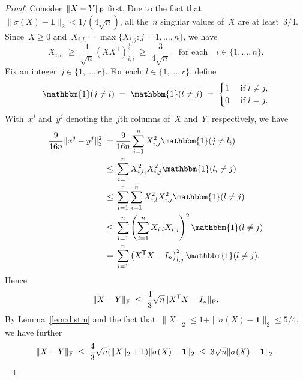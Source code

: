 \documentclass[11pt,a4paper]{article}  %
\theoremstyle{definition}
\newcommand{\ind}{\mathbbm{1}}
\newcommand{\col}{r}
\newcommand{\fro}{{\scriptstyle{\textnormal{F}}}}
\newcommand{\trs}{{\scriptstyle{\mathsf{T}}}}
\newcommand{\ones}{\mathbf{1}}
\begin{document}
\begin{proof}
    Consider~$\|X-Y\|_\fro$ first.
    Due to the fact that~$\|\sigma(X) - \ones\|_2 <1/(4\sqrt{n})$, all the~$n$ singular values
    of~$X$ are at least~$3/4$.
    Since~$X\ge 0$ and~$X_{i,l_i} = \max\{X_{i,j} \mathrel{:} j = 1, \dots, n\}$, we have
    \begin{equation*}
    X_{i, l_i}  \;\ge\; \frac{1}{\sqrt{n}}\left( XX^\trs \right)_{i,i}^{\frac{1}{2}}
    \;\ge\; \frac{3}{4\sqrt{n}}
        \quad\text{for each} \quad i \in\{1, \dots, n\}.
    \end{equation*}
    Fix an integer~$j\in\{1, \dots, \col\}$.
    For each~$l \in \{1, \dots, \col\}$, define
    \begin{equation}
        \label{eq:1lj}
        \nonumber
        \ind(j \neq l) \;=\;
        \ind(l \neq j) \;=\;
        \begin{cases}
            1 & \text{ if } l \neq j, \\
            0 & \text{ if } l = j.
        \end{cases}
    \end{equation}
    With~$x^j$ and~$y^j$ denoting the~$j$th columns of~$X$ and~$Y$, respectively, we have
    \begin{equation*}
        \begin{split}
            \frac{9}{16n}\|x^j - y^j\|_2^2
            \;=\;&  \frac{9}{16n} \sum_{i = 1}^{n} X_{i, j}^2\ind(j \neq l_i) \\
            \;\le\;&  \sum_{i = 1}^{n} X_{i,l_i}^2 X_{i, j}^2\ind(l_i \neq j) \\
            \;\le\;&
            \sum_{l=1}^n\sum_{i = 1}^{n} X_{i,l}^2 X_{i,j}^2 \ind(l \neq j) \\
            \;\le\;&  \sum_{l=1}^n\left(\sum_{i = 1}^{n} X_{i,l} X_{i,j} \right)^2 \ind(l \neq j) \\
            \;=\;&  \sum_{l=1}^n\left( X^\trs X -I_n \right)^2_{l,j} \ind(l \neq j).
        \end{split}
    \end{equation*}
       Hence
    \begin{equation*}
    \|X - Y\|_\fro \;\le\;
    \frac{4}{3}\sqrt{n}\|X^\trs X -I_n\|_\fro.
    \end{equation*}
     By Lemma~\ref{lem:distm} and the fact that~$\|X\|_2 \le 1 + \|\sigma(X) -\ones\|_2 \le 5/4$,
     we have further
    \begin{equation}
        \label{eq:xdysigma}
        \|X-Y\|_\fro \;\le\; \frac{4}{3} \sqrt{n}  (\|X\|_2+ 1)\|\sigma(X) -\ones\|_2
        \;\le\; 3\sqrt{n}\|\sigma(X) -\ones\|_2.
    \end{equation}


\end{proof}
\end{document}
